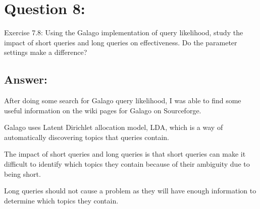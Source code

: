 \section*{Question 8:}
Exercise 7.8: Using the Galago implementation of query likelihood, study the impact of short queries and long queries on effectiveness. Do the parameter settings make a difference?

\subsection*{Answer:}

After doing some search for Galago query likelihood, I was able to find some useful information on the wiki pages for Galago on Sourceforge.

Galago uses Latent Dirichlet allocation model, LDA, which is a way of automatically discovering topics that queries contain. 

The impact of short queries and long queries is that short queries can make it difficult to identify which topics they contain because of their ambiguity due to being short.

Long queries should not cause a problem as they will have enough information to determine which topics they contain.
